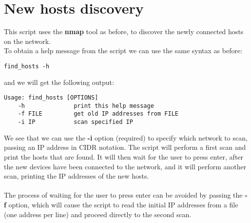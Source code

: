 \section{New hosts discovery}
This script uses the \textbf{nmap} tool as before, to discover the newly connected
hosts on the network.\\
To obtain a help message from the script we can use the same syntax as before:
\begin{lstlisting}[numbers=none]
    find_hosts -h
\end{lstlisting}
and we will get the following output:
\begin{lstlisting}[numbers=none]
    Usage: find_hosts [OPTIONS]
    -h              print this help message
    -f FILE         get old IP addresses from FILE
    -i IP           scan specified IP
\end{lstlisting}
We see that we can use the \textbf{-i} option (required) to specify which network to scan,
passing an IP address in CIDR notation. The script will perform a first scan and
print the hosts that are found. It will then wait for the user to press enter,
after the new devices have been connected to the network, and it will perform
another scan, printing the IP addresses of the new hosts.\\\\
The process of waiting for the user to press enter can be avoided by passing
the \textbf{-f} option, which will cause the script to read the initial IP addresses
from a file (one address per line) and proceed directly to the second scan.
